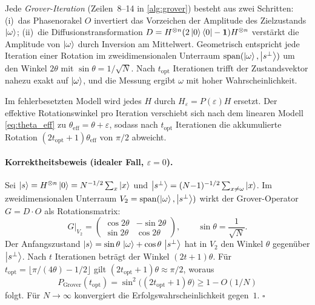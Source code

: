 ﻿\documentclass[11pt,a4paper]{article}
\theoremstyle{definition}
\newcommand{\eps}{\varepsilon}
\begin{document}
Jede \emph{Grover-Iteration} (Zeilen~8--14 in \cref{alg:grover}) besteht aus
zwei Schritten: (i)~das Phasenorakel $O$ invertiert das Vorzeichen der
Amplitude des Zielzustands $\ket{\omega}$; (ii)~die
Diffusionstransformation $D = H^{\otimes n}(2\ket{0}\bra{0}-\mathbf{1})H^{\otimes n}$
verstärkt die Amplitude von $\ket{\omega}$ durch Inversion am Mittelwert.
Geometrisch entspricht jede Iteration einer Rotation im zweidimensionalen
Unterraum $\mathrm{span}(\ket{\omega},\ket{s^\perp})$ um den Winkel $2\theta$
mit $\sin\theta = 1/\sqrt{N}$.  Nach $t_{\mathrm{opt}}$ Iterationen trifft
der Zustandsvektor nahezu exakt auf $\ket{\omega}$, und die Messung ergibt
$\omega$ mit hoher Wahrscheinlichkeit.

Im fehlerbesetzten Modell wird jedes $H$ durch $H_\varepsilon = P(\varepsilon)H$
ersetzt.  Der effektive Rotationswinkel pro Iteration verschiebt sich nach
dem linearen Modell \eqref{eq:theta_eff} zu $\theta_{\mathrm{eff}}=\theta+\eps$,
sodass nach $t_{\mathrm{opt}}$ Iterationen die akkumulierte Rotation
$(2t_{\mathrm{opt}}+1)\theta_{\mathrm{eff}}$ von $\pi/2$ abweicht.

\paragraph{Korrektheitsbeweis (idealer Fall, $\varepsilon=0$).}
Sei $\ket{s}=H^{\otimes n}\ket{0}=N^{-1/2}\sum_{x}\ket{x}$ und
$\ket{s^\perp}=(N{-}1)^{-1/2}\sum_{x\neq\omega}\ket{x}$.  Im
zweidimensionalen Unterraum $V_2=\mathrm{span}(\ket{\omega},\ket{s^\perp})$
wirkt der Grover-Operator $G=D\cdot O$ als Rotationsmatrix:
\[
  G\big|_{V_2} = \begin{pmatrix}\cos 2\theta & -\sin 2\theta \\ \sin 2\theta & \cos 2\theta\end{pmatrix},
  \qquad \sin\theta = \frac{1}{\sqrt{N}}.
\]
Der Anfangszustand $\ket{s} = \sin\theta\,\ket{\omega}+\cos\theta\,\ket{s^\perp}$
hat in $V_2$ den Winkel $\theta$ gegenüber $\ket{s^\perp}$.  Nach $t$
Iterationen beträgt der Winkel $(2t+1)\theta$.  Für
$t_{\mathrm{opt}}=\lfloor\pi/(4\theta)-1/2\rfloor$ gilt
$(2t_{\mathrm{opt}}+1)\theta \approx \pi/2$, woraus
\[
  P_{\mathrm{Grover}}(t_{\mathrm{opt}})
  = \sin^2\!\bigl((2t_{\mathrm{opt}}+1)\theta\bigr) \geq 1 - O(1/N)
\]
folgt.  Für $N\to\infty$ konvergiert die Erfolgswahrscheinlichkeit
gegen~$1$.  $\square$
\end{document}

